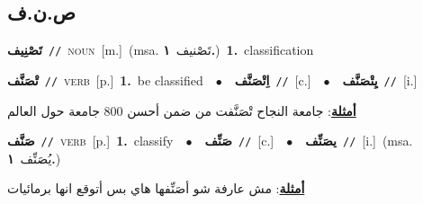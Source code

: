 \documentclass[10pt,a4paper,twoside]{article} %
\begin{document}
\begin{multicols}{2}
\vspace{-3mm}
\subsection*{\color{blue}\foreignlanguage{arabic}{ص.ن.ف}\color{blue}{}} 

{\setlength\topsep{0pt}\textbf{\foreignlanguage{arabic}{تَصْنِيف}}\ {\color{gray}\texttt{//}\color{black}}\ \textsc{noun}\ [m.]\ \color{gray}(msa. \foreignlanguage{arabic}{تَصْنيف}~\foreignlanguage{arabic}{\textbf{١.}})\color{black}\ \textbf{1.}~classification\ } \vspace{2mm}

{\setlength\topsep{0pt}\textbf{\foreignlanguage{arabic}{تْصَنَّف}}\ {\color{gray}\texttt{//}\color{black}}\ \textsc{verb}\ [p.]\ \textbf{1.}~be classified\ \ $\bullet$\ \ \setlength\topsep{0pt}\textbf{\foreignlanguage{arabic}{اِتْصَنَّف}}\ {\color{gray}\texttt{//}\color{black}}\ [c.]\ \ $\bullet$\ \ \setlength\topsep{0pt}\textbf{\foreignlanguage{arabic}{يِتْصَنَّف}}\ {\color{gray}\texttt{//}\color{black}}\ [i.]\  \begin{flushright}\color{gray}\foreignlanguage{arabic}{\textbf{\underline{\foreignlanguage{arabic}{أمثلة}}}: جامعة النجاح تْصَنَّفت من ضمن أحسن 800 جامعة حول العالم}\end{flushright}\color{black}} \vspace{2mm}

{\setlength\topsep{0pt}\textbf{\foreignlanguage{arabic}{صَنَّف}}\ {\color{gray}\texttt{//}\color{black}}\ \textsc{verb}\ [p.]\ \textbf{1.}~classify\ \ $\bullet$\ \ \setlength\topsep{0pt}\textbf{\foreignlanguage{arabic}{صَنِّف}}\ {\color{gray}\texttt{//}\color{black}}\ [c.]\ \ $\bullet$\ \ \setlength\topsep{0pt}\textbf{\foreignlanguage{arabic}{يصَنِّف}}\ {\color{gray}\texttt{//}\color{black}}\ [i.]\ \color{gray}(msa. \foreignlanguage{arabic}{يُصَنِّف}~\foreignlanguage{arabic}{\textbf{١.}})\color{black}\  \begin{flushright}\color{gray}\foreignlanguage{arabic}{\textbf{\underline{\foreignlanguage{arabic}{أمثلة}}}: مش عارفة شو أصَنِّفها هاي بس أتوقع انها برمائيات}\end{flushright}\color{black}} \vspace{2mm}


\end{multicols}
\end{document}
